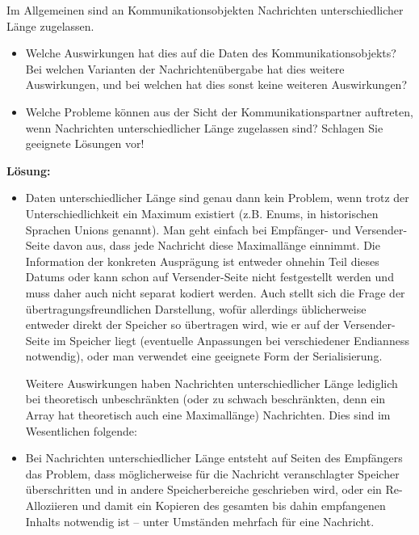 

\begin{description}

Im Allgemeinen sind an Kommunikationsobjekten Nachrichten unterschiedlicher Länge zugelassen.
    \begin{itemize}
      \item Welche Auswirkungen hat dies auf die Daten des Kommunikationsobjekts? Bei welchen Varianten der Nachrichtenübergabe hat dies weitere Auswirkungen, und bei welchen hat dies sonst keine weiteren Auswirkungen?
      \item Welche Probleme können aus der Sicht der Kommunikationspartner auftreten, wenn Nachrichten unterschiedlicher Länge zugelassen sind? Schlagen Sie geeignete Lösungen vor!
    \end{itemize}

\textbf{Lösung:}
    \begin{itemize}
      \item Daten unterschiedlicher Länge sind genau dann kein Problem, wenn trotz der Unterschiedlichkeit ein Maximum existiert (z.B. Enums, in historischen Sprachen Unions genannt). Man geht einfach bei Empfänger- und Versender-Seite davon aus, dass jede Nachricht diese Maximallänge einnimmt. Die Information der konkreten Ausprägung ist entweder ohnehin Teil dieses Datums oder kann schon auf Versender-Seite nicht festgestellt werden und muss daher auch nicht separat kodiert werden.
        Auch stellt sich die Frage der übertragungsfreundlichen Darstellung, wofür allerdings üblicherweise entweder direkt der Speicher so übertragen wird, wie er auf der Versender-Seite im Speicher liegt (eventuelle Anpassungen bei verschiedener Endianness notwendig), oder man verwendet eine geeignete Form der Serialisierung.

        Weitere Auswirkungen haben Nachrichten unterschiedlicher Länge lediglich bei theoretisch unbeschränkten (oder zu schwach beschränkten, denn ein Array hat theoretisch auch eine Maximallänge) Nachrichten.
        Dies sind im Wesentlichen folgende:
      \item Bei Nachrichten unterschiedlicher Länge entsteht auf Seiten des Empfängers das Problem, dass möglicherweise für die Nachricht veranschlagter Speicher überschritten und in andere Speicherbereiche geschrieben wird, oder ein Re-Alloziieren und damit ein Kopieren des gesamten bis dahin empfangenen Inhalts notwendig ist -- unter Umständen mehrfach für eine Nachricht.


\end{itemize}
\end{description}
